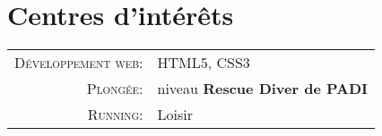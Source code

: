 %
%
%

\section{\texorpdfstring{\color{Blue}Centres d'intérêts}{Centres d'intérêts}}
\begin{tabular}{rl}
    \textsc{Développement web:} & HTML5, CSS3 \\ 
    \textsc{Plongée:} & niveau \textbf{Rescue Diver de PADI} \\
    \textsc{Running:} & Loisir \\
\end{tabular}